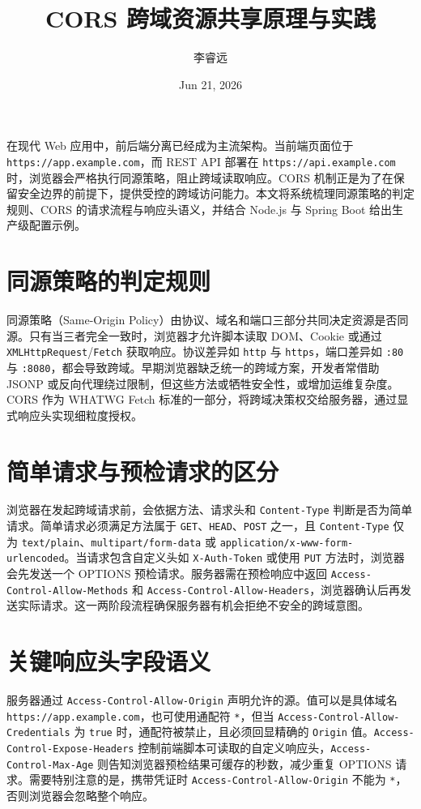\title{CORS 跨域资源共享原理与实践}
\author{李睿远}
\date{Jun 21, 2026}
\maketitle
在现代 Web 应用中，前后端分离已经成为主流架构。当前端页面位于 \texttt{https://app.example.com}，而 REST API 部署在 \texttt{https://api.example.com} 时，浏览器会严格执行同源策略，阻止跨域读取响应。CORS 机制正是为了在保留安全边界的前提下，提供受控的跨域访问能力。本文将系统梳理同源策略的判定规则、CORS 的请求流程与响应头语义，并结合 Node.js 与 Spring Boot 给出生产级配置示例。\par
\chapter{同源策略的判定规则}
同源策略（Same-Origin Policy）由协议、域名和端口三部分共同决定资源是否同源。只有当三者完全一致时，浏览器才允许脚本读取 DOM、Cookie 或通过 \texttt{XMLHttpRequest}/\texttt{Fetch} 获取响应。协议差异如 \texttt{http} 与 \texttt{https}，端口差异如 \texttt{:80} 与 \texttt{:8080}，都会导致跨域。早期浏览器缺乏统一的跨域方案，开发者常借助 JSONP 或反向代理绕过限制，但这些方法或牺牲安全性，或增加运维复杂度。CORS 作为 WHATWG Fetch 标准的一部分，将跨域决策权交给服务器，通过显式响应头实现细粒度授权。\par
\chapter{简单请求与预检请求的区分}
浏览器在发起跨域请求前，会依据方法、请求头和 \texttt{Content-Type} 判断是否为简单请求。简单请求必须满足方法属于 \texttt{GET}、\texttt{HEAD}、\texttt{POST} 之一，且 \texttt{Content-Type} 仅为 \texttt{text/plain}、\texttt{multipart/form-data} 或 \texttt{application/x-www-form-urlencoded}。当请求包含自定义头如 \texttt{X-Auth-Token} 或使用 \texttt{PUT} 方法时，浏览器会先发送一个 OPTIONS 预检请求。服务器需在预检响应中返回 \texttt{Access-Control-Allow-Methods} 和 \texttt{Access-Control-Allow-Headers}，浏览器确认后再发送实际请求。这一两阶段流程确保服务器有机会拒绝不安全的跨域意图。\par
\chapter{关键响应头字段语义}
服务器通过 \texttt{Access-Control-Allow-Origin} 声明允许的源。值可以是具体域名 \texttt{https://app.example.com}，也可使用通配符 \texttt{*}，但当 \texttt{Access-Control-Allow-Credentials} 为 \texttt{true} 时，通配符被禁止，且必须回显精确的 \texttt{Origin} 值。\texttt{Access-Control-Expose-Headers} 控制前端脚本可读取的自定义响应头，\texttt{Access-Control-Max-Age} 则告知浏览器预检结果可缓存的秒数，减少重复 OPTIONS 请求。需要特别注意的是，携带凭证时 \texttt{Access-Control-Allow-Origin} 不能为 \texttt{*}，否则浏览器会忽略整个响应。\par
